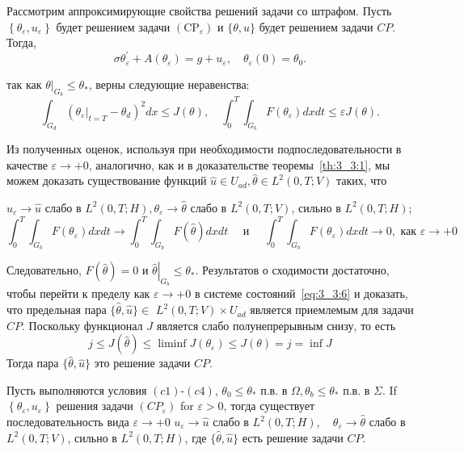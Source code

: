 Рассмотрим аппроксимирующие свойства решений задачи со штрафом.
Пусть $\left\{\theta_{\varepsilon}, u_{\varepsilon}\right\}$ будет решением задачи
$\left(\mathrm{CP}_{\varepsilon}\right)$ и $\{\theta, u\}$ будет решением задачи $CP$.
Тогда,
\begin{equation}
    \label{eq:3_3:6}
    \sigma \theta_{\varepsilon}^{\prime}
    + A\left(\theta_{\varepsilon}\right)=g + u_{\varepsilon},
    \quad \theta_{\varepsilon}(0) = \theta_{0}.
\end{equation}

так как $\left.\theta\right|_{G_{b}} \leq \theta_{*}$, верны следующие неравенства:
\[
    \int_{G_{d}}\left(\left.\theta_{\varepsilon}\right|_{t=T}-\theta_{d}\right)^{2} d x \leq J(\theta),
    \quad \int_{0}^{T} \int_{G_{b}} F\left(\theta_{\varepsilon}\right) d x d t \leq \varepsilon J(\theta).
\]

Из полученных оценок, используя при необходимости подпоследовательности в качестве
$\varepsilon \rightarrow+0$, аналогично, как и в доказательстве теоремы~\ref{th:3_3:1},
мы можем доказать существование функций
$\widehat{u} \in U_{a d}, \widehat{\theta} \in L^{2}(0, T ; V)$ таких, что

$u_{\varepsilon} \rightarrow \widehat{u}$ слабо в
$L^{2}(0, T ; H), \theta_{\varepsilon} \rightarrow \widehat{\theta}$ слабо в $L^{2}(0, T ; V)$,
сильно в $L^{2}(0, T ; H)$;
\[
    \int_{0}^{T} \int_{G_{b}} F\left(\theta_{\varepsilon}\right) d x d t \rightarrow \int_{0}^{T}
    \int_{G_{b}} F(\widehat{\theta}) dx dt \quad \text { и } \quad \int_{0}^{T} \int_{G_{b}}
    F\left(\theta_{\varepsilon}\right) dx dt \rightarrow 0, \text { как } \varepsilon \rightarrow+0
\]

Следовательно, $F(\widehat{\theta})=0$ и $\left.\widehat{\theta}\right|_{G_{b}} \leq \theta_{*}$.
Результатов о сходимости достаточно, чтобы перейти к пределу как $\varepsilon \rightarrow+0$
в системе состояний~\eqref{eq:3_3:6} и доказать, что предельная пара
$\{\widehat{\theta}, \widehat{u}\} \in$ $L^{2}(0, T ; V) \times U_{a d}$
является приемлемым для задачи $CP$.
Поскольку функционал $J$ является слабо полунепрерывным снизу, то есть
\[
    j \leq J(\widehat{\theta}) \leq \liminf J\left(\theta_{\varepsilon}\right) \leq J(\theta)=j=\inf J
\]
Тогда пара $\{\widehat{\theta}, \widehat{u}\}$ это решение задачи $CP$.
\begin{theorem}
    Пусть выполняются условия $(c1)$-$(c4)$,
    $\theta_{0} \leq \theta_{*}$ п.в. в $\Omega, \theta_{b} \leq \theta_{*}$ п.в. в
    $\Sigma$.
    If $\left\{\theta_{\varepsilon}, u_{\varepsilon}\right\}$ решения задачи
    $\left(C P_{\varepsilon}\right)$ for $\varepsilon>0$, тогда существует последовательность вида
    $\varepsilon \rightarrow+0$ $u_{\varepsilon} \rightarrow \widehat{u}$ слабо в
    $L^{2}(0, T ; H), \quad \theta_{\varepsilon} \rightarrow \widehat{\theta}$
    слабо в $L^{2}(0, T ; V)$,
    сильно в $L^{2}(0, T ; H)$, где
    $\{\widehat{\theta}, \widehat{u}\}$ есть решение задачи $CP$.
\end{theorem}

